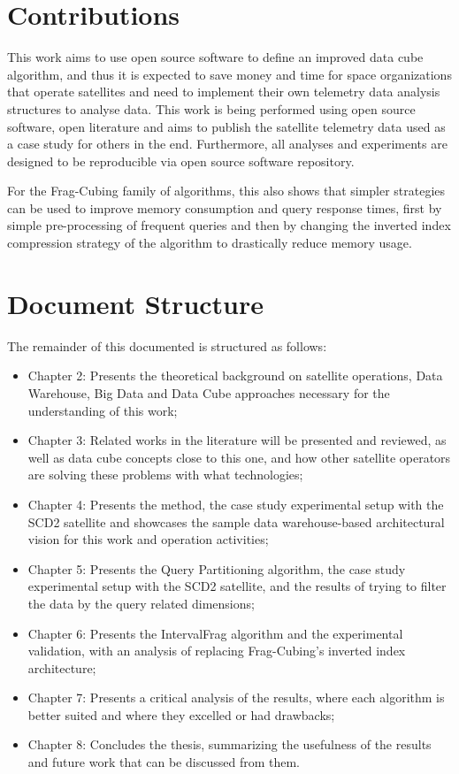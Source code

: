 \section{Contributions}\label{ch:intro:contrib}

This work aims to use open source software to define an improved data cube algorithm, and thus it is expected to save money and time for space organizations that operate satellites and need to implement their own telemetry data analysis structures to analyse data.
This work is being performed using open source software, open literature and aims to publish the satellite telemetry data used as a case study for others in the end.
Furthermore, all analyses and experiments are designed to be reproducible via open source software repository.

For the Frag-Cubing family of algorithms, this also shows that simpler strategies can be used to improve memory consumption and query response times, first by simple pre-processing of frequent queries and then by changing the inverted index compression strategy of the algorithm to drastically reduce memory usage.

\section{Document Structure}\label{ch:intro:org}

The remainder of this documented is structured as follows:

\begin{itemize}[noitemsep]
  \item{Chapter 2}: Presents the theoretical background on satellite operations, Data Warehouse, Big Data and Data Cube approaches necessary for the understanding of this work;
  \item{Chapter 3}: Related works in the literature will be presented and reviewed, as well as data cube concepts close to this one, and how other satellite operators are solving these problems with what technologies;
  \item{Chapter 4}: Presents the method, the case study experimental setup with the SCD2 satellite and showcases the sample data warehouse-based architectural vision for this work and operation activities;
  \item{Chapter 5}: Presents the Query Partitioning algorithm, the case study experimental setup with the SCD2 satellite, and the results of trying to filter the data by the query related dimensions;
  \item{Chapter 6}: Presents the IntervalFrag algorithm and the experimental validation, with an analysis of replacing Frag-Cubing's inverted index architecture;
  \item{Chapter 7}: Presents a critical analysis of the results, where each algorithm is better suited and where they excelled or had drawbacks;
  \item{Chapter 8}: Concludes the thesis, summarizing the usefulness of the results and future work that can be discussed from them.
\end{itemize}

